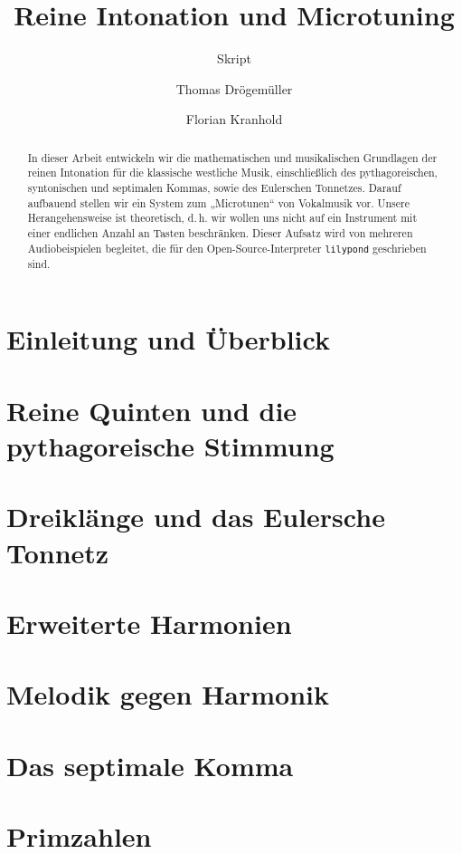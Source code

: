 \documentclass[ngerman,11pt]{scrartcl}
\title     {Reine Intonation und Microtuning}
\author    {Thomas Drögemüller\and Florian Kranhold}
\subtitle  {Skript}
\begin{document}
\maketitle

\begin{abstract}
  In dieser Arbeit entwickeln wir die mathematischen und musikalischen
  Grundlagen der reinen Intonation für die klassische westliche Musik,
  einschließlich des pythagoreischen, syntonischen und septimalen Kommas, sowie
  des Eulerschen Tonnetzes. Darauf aufbauend stellen wir ein System zum
  „Microtunen“ von Vokalmusik vor. Unsere Herangehensweise ist theoretisch,
  d.\,h. wir wollen uns nicht auf ein Instrument mit einer endlichen Anzahl an
  Tasten beschränken. Dieser Aufsatz wird von mehreren Audiobeispielen
  begleitet, die für den Open-Source-Interpreter \texttt{lilypond} geschrieben
  sind.
\end{abstract}

\section{Einleitung und Überblick}
\label{sec:int}


\section{Reine Quinten und die pythagoreische Stimmung}
\label{sec:pyth}


\section{Dreiklänge und das Eulersche Tonnetz}
\label{sec:tri}


\section{Erweiterte Harmonien}
\label{sec:quad}


\section{Melodik gegen Harmonik}
\label{sec:melody}


\section{Das septimale Komma}
\label{sec:sept}


\appendix
\section{Primzahlen}


\printbibliography[heading=bibintoc]
\end{document}
